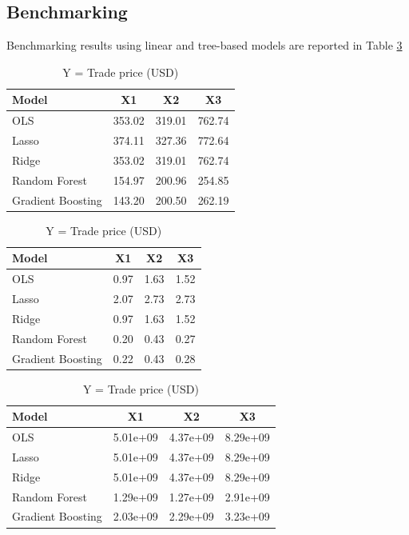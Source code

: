 \documentclass[12pt]{article}
\begin{document}
\subsection{Benchmarking}
Benchmarking results using linear and tree-based models are reported in Table \ref{tab:benchmark}
\begin{table}[H]
    \centering
    \caption{MSE Loss Metric for Benchmark Models and Explanatory Variable Sets}
    \label{tab:benchmark}

    \begin{subtable}{\linewidth}
    \centering
    \caption{Y = Trade price (ETH)}
    \begin{tabular}{lccc}
    \hline
    Model & X1 & X2 & X3 \\ 
    \hline
    OLS & 353.02 & 319.01 & 762.74 \\
    Lasso & 374.11 & 327.36 & 772.64 \\
    Ridge & 353.02 & 319.01 & 762.74 \\
    Random Forest & 154.97 & 200.96 & 254.85 \\
    Gradient Boosting & 143.20 & 200.50 & 262.19 \\
    \hline
    \end{tabular}
    \end{subtable}%
    \bigskip
    
    \begin{subtable}{\linewidth}
    \centering
    \caption{Y = log (Trade price (ETH))}
    \begin{tabular}{lccc}
    \hline
    Model & X1 & X2 & X3 \\ 
    \hline
    OLS & 0.97 & 1.63 & 1.52 \\
    Lasso & 2.07 & 2.73 & 2.73 \\
    Ridge & 0.97 & 1.63 & 1.52 \\
    Random Forest & 0.20 & 0.43 & 0.27 \\
    Gradient Boosting & 0.22 & 0.43 & 0.28 \\
    \hline
    \end{tabular}
    \end{subtable}%
    \bigskip
    
    \begin{subtable}{\linewidth}
    \centering
    \caption{Y = Trade price (USD)}
    \begin{tabular}{lccc}
    \hline
    Model & X1 & X2 & X3 \\ 
    \hline
    OLS & 5.01e+09 & 4.37e+09 & 8.29e+09 \\
    Lasso & 5.01e+09 & 4.37e+09 & 8.29e+09 \\
    Ridge & 5.01e+09 & 4.37e+09 & 8.29e+09 \\
    Random Forest & 1.29e+09 & 1.27e+09 & 2.91e+09 \\
    Gradient Boosting & 2.03e+09 & 2.29e+09 & 3.23e+09 \\
    \hline
    \end{tabular}
    \end{subtable}
\end{table}
    
\end{document}
